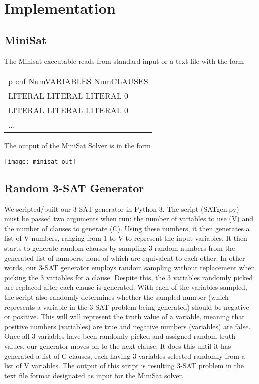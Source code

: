 \documentclass{eptcs}
\begin{document}
\section*{Implementation}
\subsection*{MiniSat}
The Minisat executable reads from standard input or a text file with the form
\begin{center}
	\begin{tabular}{l}
	p cnf NumVARIABLES NumCLAUSES\\
	LITERAL LITERAL LITERAL 0\\
	LITERAL LITERAL LITERAL 0\\
	...
	\end{tabular}
\end{center}
\newpage
The output of the MiniSat Solver is in the form
\begin{center}
	\centering
	\texttt{[image: minisat\_out]}
\end{center}
\subsection*{Random 3-SAT Generator}
We scripted/built our 3-SAT generator in Python 3.  The script (SATgen.py) must be passed two arguments when run: the number of variables to use (V) and the number of clauses to generate (C). Using these numbers, it then generates a list of V numbers, ranging from 1 to V to represent the input variables. It then starts to generate random clauses by sampling 3 random numbers from the generated list of numbers, none of which are equivalent to each other. In other words, our 3-SAT generator employs random sampling without replacement when picking the 3 variables for a clause. Despite this, the 3 variables randomly picked are replaced after each clause is generated. With each of the variables sampled, the script also randomly determines whether the sampled number (which represents a variable in the 3-SAT problem being generated) should be negative or positive. This will will represent the truth value of a variable, meaning that positive numbers (variables) are true and negative numbers (variables) are false. Once all 3 variables have been randomly picked and assigned random truth values, our generator moves on to the next clause. It does this until it has generated a list of C clauses, each having 3 variables selected randomly from a list of V variables. The output of this script is resulting 3-SAT problem in the text file format designated as input for the MiniSat solver.
\end{document}
